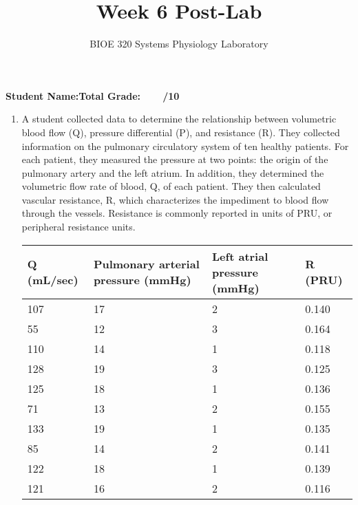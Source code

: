 \documentclass{article}
\title{Week 6 Post-Lab}
\author{BIOE 320 Systems Physiology Laboratory}
\date{}
\begin{document}
\maketitle
\large

\textbf{Student Name:}\hfill 	\textbf{Total Grade:\ \ \ \ /10}\vspace{0.5cm}

\begin{enumerate}
	\item A student collected data to determine the relationship between volumetric blood flow (Q), pressure differential (\textDelta P), and resistance (R). They collected information on the pulmonary circulatory system of ten healthy patients. For each patient, they measured the pressure at two points: the origin of the pulmonary artery and the left atrium. In addition, they determined the volumetric flow rate of blood, Q, of each patient. They then calculated vascular resistance, R, which characterizes the impediment to blood flow through the vessels. Resistance is commonly reported in units of PRU, or peripheral resistance units.
	
	\begin{table}[h]
	\centering
	\begin{tabular}[h!]{p{}p{}p{}p{}}
	\toprule
	Q (mL/sec) & Pulmonary arterial pressure (mmHg) & Left atrial pressure (mmHg) & R (PRU)\\
	\midrule
	107 & 17 & 2 & 0.140\\\midrule
	55 & 12 & 3 & 0.164\\\midrule
	110 & 14 & 1 & 0.118\\\midrule
	128 & 19 & 3 & 0.125\\\midrule
	125 & 18 & 1 & 0.136\\\midrule
	71 & 13 & 2 & 0.155\\\midrule
	133 & 19 & 1 & 0.135\\\midrule
	85 & 14 & 2 & 0.141\\\midrule
	122 & 18 & 1 & 0.139\\\midrule
	121 & 16 & 2 & 0.116\\\bottomrule
	\end{tabular}
	\end{table}
	

\end{enumerate}
\end{document}
